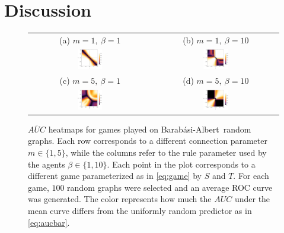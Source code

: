 \documentclass[letterpaper]{article}
\newcommand{\BA}{Barab\'{a}si-Albert~}
\begin{document}
\section{Discussion}\label{sec:discussion}

\begin{figure}[!t]
    \begin{tabular}{cc}
        {\footnotesize (a) $m=1,~\beta=1$} & {\footnotesize (b) $m=1,~\beta=10$} \\
        \includegraphics[width=0.21\textwidth]{"heatmap/BarabasiAlbert_1_01"} &
        \includegraphics[width=0.21\textwidth]{"heatmap/BarabasiAlbert_1_10"} \\
        {\footnotesize (c) $m=5,~\beta=1$} & {\footnotesize (d) $m=5,~\beta=10$} \\
        \includegraphics[width=0.21\textwidth]{"heatmap/BarabasiAlbert_5_01"} &
        \includegraphics[width=0.21\textwidth]{"heatmap/BarabasiAlbert_5_10"}
    \end{tabular}
    \caption{\label{fig:ba}
    $\overline{AUC}$ heatmaps for games played on \BA random graphs. Each row corresponds to a different connection parameter $m\in\{1,5\}$, while the columns refer to the rule parameter used by the agents $\beta\in\{1,10\}$. Each point in the plot corresponds to a different game parameterized as in \cref{eq:game} by $S$ and $T$. For each game, $100$ random graphs were selected and an average ROC curve was generated. The color represents how much the $AUC$ under the mean curve differs from the uniformly random predictor as in \cref{eq:aucbar}. \\}
\end{figure}
\end{document}
